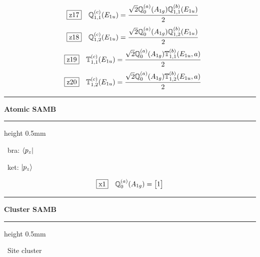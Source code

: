 \documentclass[fleqn,10pt,landscape]{jsarticle}
\begin{document}
\begin{dmath*}
\hspace*{3mm}\fbox{z17}\quad \mathbb{Q}_{1,1}^{(c)}(E_{1u})=\frac{\sqrt{2} \mathbb{Q}_{0}^{(a)}(A_{1g}) \mathbb{Q}_{1,1}^{(b)}(E_{1u})}{2}
\end{dmath*}
\begin{dmath*}
\hspace*{3mm}\fbox{z18}\quad \mathbb{Q}_{1,2}^{(c)}(E_{1u})=\frac{\sqrt{2} \mathbb{Q}_{0}^{(a)}(A_{1g}) \mathbb{Q}_{1,2}^{(b)}(E_{1u})}{2}
\end{dmath*}
\begin{dmath*}
\hspace*{3mm}\fbox{z19}\quad \mathbb{T}_{1,1}^{(c)}(E_{1u})=\frac{\sqrt{2} \mathbb{Q}_{0}^{(a)}(A_{1g}) \mathbb{T}_{1,1}^{(b)}(E_{1u},a)}{2}
\end{dmath*}
\begin{dmath*}
\hspace*{3mm}\fbox{z20}\quad \mathbb{T}_{1,2}^{(c)}(E_{1u})=\frac{\sqrt{2} \mathbb{Q}_{0}^{(a)}(A_{1g}) \mathbb{T}_{1,2}^{(b)}(E_{1u},a)}{2}
\end{dmath*}
\vspace{5mm}

\vspace{5mm}
\noindent \rule[0.5mm]{5mm}{0.5mm}\hspace{3mm}\textbf{Atomic SAMB}\hspace{3mm}\leaders\hrule height 0.5mm\hfill\kern0pt
\vspace{3mm}

\vspace{5mm}

\noindent\textbullet\, bra: $\bra{p_{z}}$

\noindent\textbullet\, ket: $\ket{p_{z}}$

\begin{dmath*}
\fbox{x1}\quad \mathbb{Q}_{0}^{(a)}(A_{1g})=\begin{bmatrix} 1 \end{bmatrix}
\end{dmath*}
\vspace{5mm}
\noindent \rule[0.5mm]{5mm}{0.5mm}\hspace{3mm}\textbf{Cluster SAMB}\hspace{3mm}\leaders\hrule height 0.5mm\hfill\kern0pt
\vspace{3mm}

\noindent\textbullet\, Site cluster

\vspace{5mm}
\end{document}
